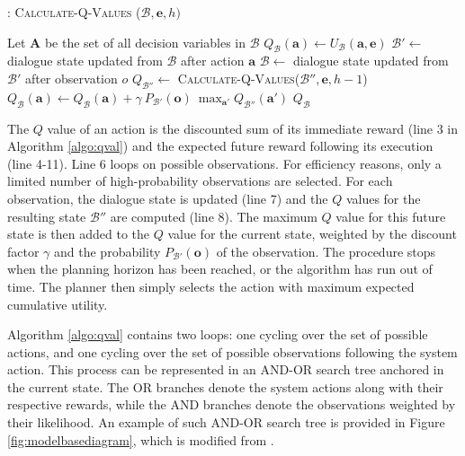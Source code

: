 \begin{algorithm}[h!]
\caption{: \textsc{Calculate-Q-Values} ($\mathcal{B}, \mathbf{e}, h)$}
\begin{algorithmic}[1] \vspace{1mm}
\STATE Let $\mathbf{A}$ be the set of all decision variables in $\mathcal{B}$
\STATE $Q_{\mathcal{B}}(\mathbf{a}) \leftarrow U_{\mathcal{B}}(\mathbf{a}, \mathbf{e})$
\STATE $\mathcal{B}' \leftarrow $ dialogue state updated from $\mathcal{B}$ after action $\mathbf{a}$
\STATE $\mathcal{B} \leftarrow $ dialogue state updated from $\mathcal{B}'$ after observation $o$
\STATE $Q_{\mathcal{B}''} \leftarrow $ \textsc{Calculate-Q-Values}($\mathcal{B}'', \mathbf{e}, h -1$)
\STATE $Q_{\mathcal{B}}(\mathbf{a}) \leftarrow Q_{\mathcal{B}}(\mathbf{a}) + \gamma \ P_{\mathcal{B}'}(\mathbf{o}) \ \max_{\mathbf{a}'} Q_{\mathcal{B}''}(\mathbf{a}')$
\ENDFOR
\ENDIF
\ENDFOR
\RETURN $Q_{\mathcal{B}}$
\end{algorithmic} 
\label{algo:qval}
\end{algorithm}

The $Q$ value of an action is the discounted sum of its immediate reward (line 3 in Algorithm \ref{algo:qval}) and the expected future reward following its execution (line 4-11).  Line 6 loops on possible observations.  For efficiency reasons, only a limited number of high-probability observations are selected. For each observation, the dialogue state is updated (line 7) and the $Q$ values for the resulting state $\mathcal{B}''$ are computed (line 8).  The maximum $Q$ value for this future state is then added to the $Q$ value for the current state, weighted by the discount factor $\gamma$ and the probability $P_{\mathcal{B}'} (\mathbf{o})$ of the observation.  The procedure stops when the planning horizon has been reached, or the algorithm has run out of time. The planner then simply selects the action with maximum expected cumulative utility. 

Algorithm \ref{algo:qval} contains two loops: one cycling over the set of possible actions, and one cycling over the set of possible observations following the system action. This process can be represented in an AND-OR search tree anchored in the current state. The OR branches denote the system actions along with their respective rewards, while the AND branches denote the observations weighted by their likelihood. An example of such AND-OR search tree is provided in Figure \ref{fig:modelbasediagram}, which is modified from \cite{ross2008}.


